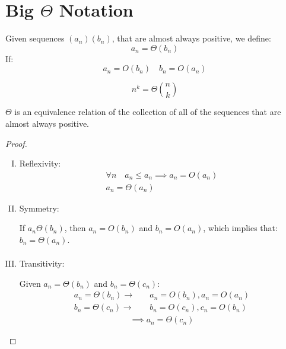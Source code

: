 \documentclass[00_complete]{subfiles}
\begin{document}
\section{Big \texorpdfstring{$\Theta$}{Theta} Notation}
\begin{definition}
   Given sequences $(a_n)(b_n)$, that are almost always positive, we define:
   $$a_n = \Theta(b_n)$$
   If:
   $$a_n=O(b_n) \quad b_n=O(a_n)$$
\end{definition}
\begin{example}
    $$n^k=\Theta\binom{n}{k}$$
\end{example}
\begin{claim}
    $\Theta$ is an equivalence relation of the collection of all of the
    sequences that are almost always positive.
    \begin{proof}
        \begin{enumerate}[I.]
            \item Reflexivity:
            \begin{gather*}
                \forall n \quad a_n \leq a_n \implies a_n = O(a_n) \\
                a_n = \Theta(a_n) \tag{\checkmark}
            \end{gather*}
            \item Symmetry:

                If $a_n \Theta(b_n)$, then $a_n = O(b_n)$ and $b_n=O(a_n)$,
                which implies that: $b_n = \Theta(a_n)$.
                \begin{gather*}
                    \tag{\checkmark}
                \end{gather*}
            \item Transitivity:

                Given $a_n=\Theta(b_n)$ and $b_n=\Theta(c_n)$:
                \begin{align*}
                    a_n=\Theta(b_n) \to \quad& a_n=O(b_n), a_n=O(a_n) \\
                    b_n=\Theta(c_n) \to \quad& b_n=O(c_n), c_n=O(b_n)
                \end{align*}
                \begin{gather*}
                    \implies a_n=\Theta(c_n) \tag{\checkmark}
                \end{gather*}
        \end{enumerate}
    \end{proof}
\end{claim}
\end{document}
